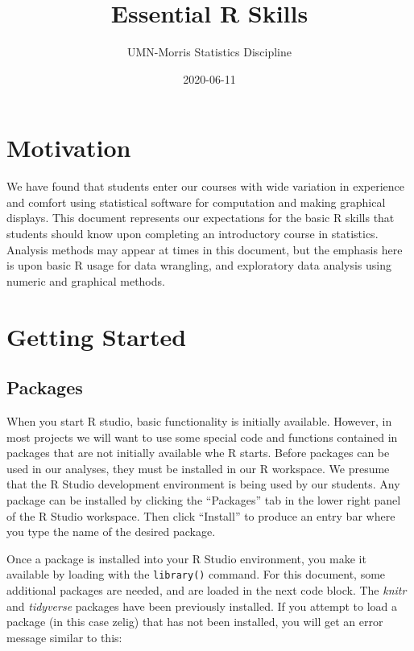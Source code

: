 \documentclass[]{book}
\title{Essential R Skills}
\author{UMN-Morris Statistics Discipline}
\date{2020-06-11}
\begin{document}
\maketitle

{
\setcounter{tocdepth}{1}
\tableofcontents
}
\chapter{Motivation}\label{motivation}

We have found that students enter our courses with wide variation in
experience and comfort using statistical software for computation and
making graphical displays. This document represents our expectations for
the basic R skills that students should know upon completing an
introductory course in statistics. Analysis methods may appear at times
in this document, but the emphasis here is upon basic R usage for data
wrangling, and exploratory data analysis using numeric and graphical
methods.

\chapter{Getting Started}\label{GettingStarted}

\section{Packages}\label{packages}

When you start R studio, basic functionality is initially available.
However, in most projects we will want to use some special code and
functions contained in packages that are not initially available whe R
starts. Before packages can be used in our analyses, they must be
installed in our R workspace. We presume that the R Studio development
environment is being used by our students. Any package can be installed
by clicking the ``Packages'' tab in the lower right panel of the R
Studio workspace. Then click ``Install'' to produce an entry bar where
you type the name of the desired package.

Once a package is installed into your R Studio environment, you make it
available by loading with the \texttt{library()} command. For this
document, some additional packages are needed, and are loaded in the
next code block. The \emph{knitr} and \emph{tidyverse} packages have
been previously installed. If you attempt to load a package (in this
case zelig) that has not been installed, you will get an error message
similar to this:
\end{document}

